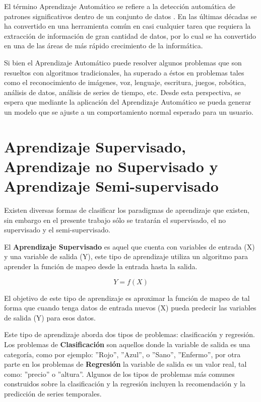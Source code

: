 El t\'{e}rmino Aprendizaje Autom\'{a}tico se refiere a la detecci\'{o}n autom\'{a}tica de patrones significativos dentro de un conjunto de datos \cite{32}. En las \'{u}ltimas d\'{e}cadas se ha convertido en una herramienta com\'{u}n en casi cualquier tarea que requiera la extracci\'{o}n de informaci\'{o}n de gran cantidad de datos, por lo cual se ha convertido en una de las \'{a}reas de m\'{a}s r\'{a}pido crecimiento de la inform\'{a}tica.

\vspace{5mm} %

Si bien el Aprendizaje Autom\'{a}tico puede resolver algunos problemas que son resueltos con algoritmos tradicionales, ha superado a \'{e}stos en problemas tales como el reconocimiento de im\'{a}genes, voz, lenguaje, escritura, juegos, rob\'{o}tica, an\'{a}lisis de datos, an\'{a}lisis de series de tiempo, etc. Desde esta perspectiva, se espera que mediante la aplicaci\'{o}n del Aprendizaje Autom\'{a}tico se pueda generar un modelo que se ajuste a un comportamiento normal esperado para un usuario.

\section{Aprendizaje Supervisado, Aprendizaje no Supervisado y Aprendizaje Semi-supervisado}

Existen diversas formas de clasificar los paradigmas de aprendizaje que existen, sin embargo en el presente trabajo s\'{o}lo se tratar\'{a}n el supervisado, el no supervisado y el semi-supervisado.

\vspace{5mm} %

El \textbf{Aprendizaje Supervisado} es aquel que cuenta con variables de entrada (X) y una variable de salida (Y), este tipo de aprendizaje utiliza un algoritmo para aprender la funci\'{o}n de mapeo desde la entrada hasta la salida.

\begin{equation}
Y = f(X)
\end{equation}

El objetivo de este tipo de aprendizaje es aproximar la funci\'{o}n de mapeo de tal forma que cuando tenga datos de entrada nuevos (X) pueda predecir las variables de salida (Y) para esos datos. 

\vspace{5mm} %

Este tipo de aprendizaje aborda dos tipos de problemas: clasificaci\'{o}n y regresi\'{o}n. Los problemas de \textbf{Clasificaci\'{o}n} son aquellos donde la variable de salida es una categor\'{i}a, como por ejemplo: ''Rojo'', ''Azul'', o ''Sano'', ''Enfermo'', por otra parte en los problemas de \textbf{Regresi\'{o}n} la variable de salida es un valor real, tal como: ''precio'' o ''altura''. Algunos de los tipos de problemas m\'{a}s comunes construidos sobre la clasificaci\'{o}n y la regresi\'{o}n incluyen la recomendaci\'{o}n y la predicci\'{o}n de series temporales.


